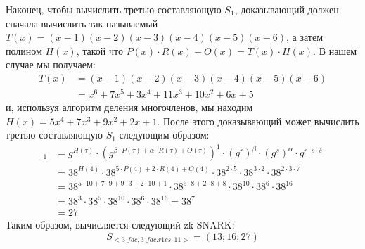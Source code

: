 Наконец, чтобы вычислить третью составляющую $S_1$, доказывающий должен сначала вычислить так называемый  $T(x)=(x-1)(x-2)(x-3)(x-4)(x-5)(x-6)$, а затем полином $H(x)$, такой что $P(x)\cdot R(x) - O(x) = T(x)\cdot H(x)$. В нашем случае мы получаем:
\begin{align*}
T(x) & = (x-1)(x-2)(x-3)(x-4)(x-5)(x-6)\\
     & = x^6 + 7x^5 + 3x^4 + 11x^3 + 10x^2 + 6x + 5
\end{align*}
и, используя алгоритм деления многочленов, мы находим $H(x)=5x^4 + 7x^3 + 9x^2 + 2x + 1$. После этого доказывающий может вычислить третью составляющую $S_1$ следующим образом:
\begin{align*}
[\mathbb{C}]_1 & = g^{H(\tau)}\cdot (g^{\beta\cdot P(\tau)+\alpha\cdot R(\tau)+O(\tau)})^1 \cdot (g^r)^\beta \cdot (g^s)^\alpha \cdot g^{r\cdot s\cdot \delta}\\
               & = 38^{H(4)}\cdot 38^{5\cdot P(4)+2\cdot R(4)+O(4)} \cdot 38^{2\cdot 5}\cdot 38^{3\cdot 2}\cdot 38^{2\cdot 3\cdot 7}\\
               & = 38^{5\cdot 10 + 7\cdot 9 + 9\cdot 3 + 2\cdot 10 + 1} \cdot 38^{5\cdot 8 + 2\cdot 8 + 8} \cdot 38^{10} \cdot 38^{6} \cdot 38^{16}\\
               & = 38^{3}\cdot 38^{5}\cdot 38^{10}\cdot 38^{6}\cdot 38^{16} = 38^{7}\\
               & = 27
\end{align*}
Таким образом, вычисляется следующий zk-SNARK:
\begin{equation}
S_{<3\_fac,3\_fac.r1cs,11>} = (13; 16; 27)
\end{equation}

